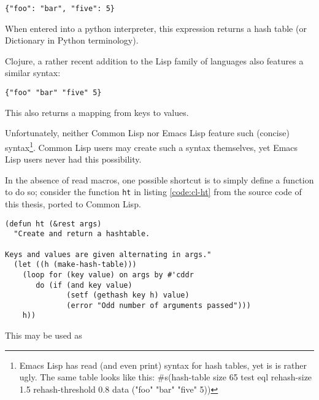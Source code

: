 \documentclass[a4paper,10pt,twoside]{report}
\newcommand{\el}{Emacs Lisp}
\newcommand{\cl}{Common Lisp}
\newcommand{\fun}[1]{\texttt{#1}}
\begin{document}
\begin{lstlisting}[style=pythoncode]
{"foo": "bar", "five": 5}
\end{lstlisting}

When entered into a python interpreter, this expression returns a hash table (or
Dictionary in Python terminology).

Clojure, a rather recent addition to the Lisp family of languages also features
a similar syntax:


\begin{lstlisting}[style=lispinline]
{"foo" "bar" "five" 5}
\end{lstlisting}

This also returns a mapping from keys to values.

Unfortunately, neither \cl{} nor \el{} feature such (concise)
syntax\footnote{\el{} has read (and even print) syntax for hash tables, yet is
  is rather ugly.  The same table looks like this: \#s(hash-table size 65 test
  eql rehash-size 1.5 rehash-threshold 0.8 data ("foo" "bar" "five" 5))}.  \cl{}
users may create such a syntax themselves, yet \el{} users never had this
possibility.

In the absence of read macros, one possible shortcut is to simply define a
function to do so; consider the function \fun{ht} in listing \ref{code:cl-ht}
from the source code of this thesis, ported to \cl{}.



\begin{lstlisting}[style=lispcode,caption={Creating a hash
  table.},label={code:cl-ht}]
(defun ht (&rest args)
  "Create and return a hashtable.

Keys and values are given alternating in args."
  (let ((h (make-hash-table)))
    (loop for (key value) on args by #'cddr
       do (if (and key value)
              (setf (gethash key h) value)
              (error "Odd number of arguments passed")))
    h))
\end{lstlisting}
This may be used as
\end{document}
